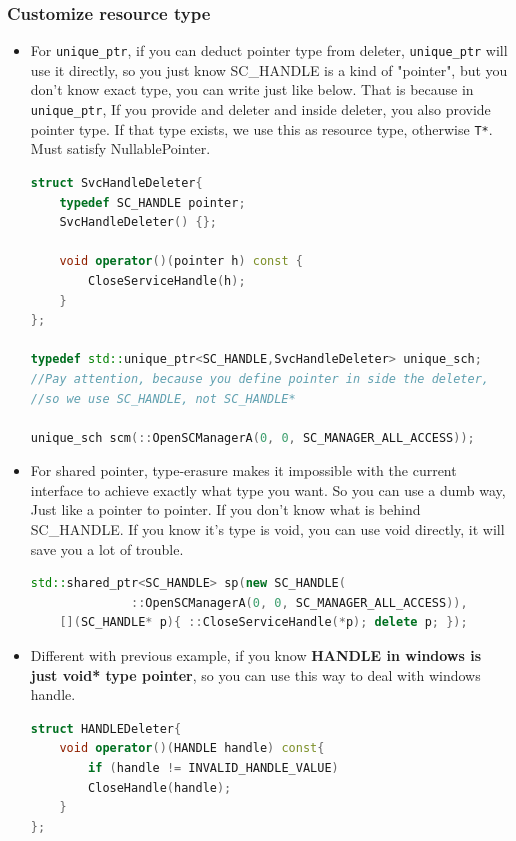 \documentclass[a4paper,11pt,twoside]{book}
\begin{document}
\subsubsection{Customize resource type}
\begin{itemize}
		\item For \texttt{unique\_ptr}, if you can deduct pointer type from deleter, \texttt{unique\_ptr} will use it directly, so you just know SC\_HANDLE is a kind of "pointer", but you don't know exact type, you can write just like below.  That is because in \texttt{unique\_ptr}, If you provide and deleter and inside deleter, you also provide pointer type. If that type exists, we use this as resource type, otherwise \texttt{T*}. Must satisfy NullablePointer.

\begin{lstlisting}[frame=single, language=c++]
struct SvcHandleDeleter{
	typedef SC_HANDLE pointer;
	SvcHandleDeleter() {};
	
	void operator()(pointer h) const {
		CloseServiceHandle(h);
	}
};
	
typedef std::unique_ptr<SC_HANDLE,SvcHandleDeleter> unique_sch;
//Pay attention, because you define pointer in side the deleter, 
//so we use SC_HANDLE, not SC_HANDLE* 
	
unique_sch scm(::OpenSCManagerA(0, 0, SC_MANAGER_ALL_ACCESS));
\end{lstlisting}
	
	\item For shared pointer, type-erasure makes it impossible with the current interface to achieve exactly what type you want. So you can use a dumb way, Just like a pointer to pointer. If you don't know what is behind SC\_HANDLE. If you know it's type is void, you can use void directly, it will save you a lot of trouble. 
	
\begin{lstlisting}[frame=single, language=c++]
std::shared_ptr<SC_HANDLE> sp(new SC_HANDLE(
              ::OpenSCManagerA(0, 0, SC_MANAGER_ALL_ACCESS)),
	[](SC_HANDLE* p){ ::CloseServiceHandle(*p); delete p; });
\end{lstlisting}

		\item Different with previous example, if you know \textbf{HANDLE in windows is just void* type pointer}, so you can use this way to deal with windows handle.
	
\begin{lstlisting}[frame=single, language=c++]
struct HANDLEDeleter{
	void operator()(HANDLE handle) const{
		if (handle != INVALID_HANDLE_VALUE)
		CloseHandle(handle);
	}
};
	

\end{lstlisting}
\end{itemize}
\end{document}
